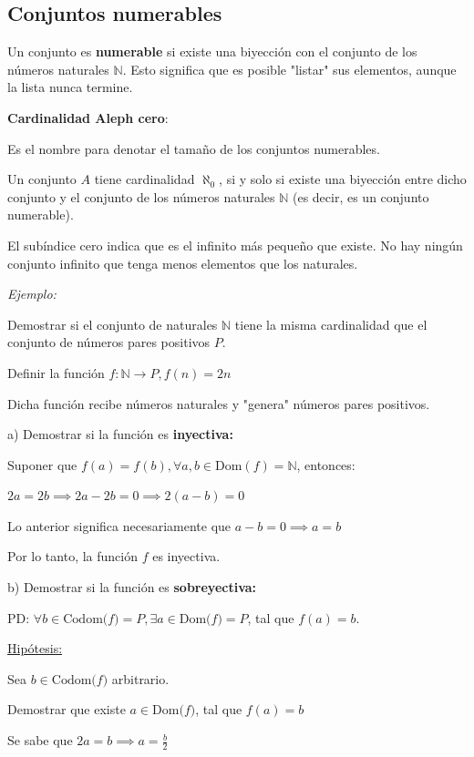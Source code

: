 \documentclass{article}
\begin{document}
\subsection{Conjuntos numerables}

Un conjunto es \textbf{numerable} si existe una biyección con el conjunto de los números naturales $\mathbb{N}$. Esto significa que es posible "listar" sus elementos, aunque la lista nunca termine.

\textbf{Cardinalidad Aleph cero}: 

Es el nombre para denotar el tamaño de los conjuntos numerables.

Un conjunto $A$ tiene cardinalidad $\aleph_0$, si y solo si existe una biyección entre dicho conjunto y el conjunto de los números naturales $\mathbb{N}$ (es decir, es un conjunto numerable).

El subíndice cero indica que es el infinito más pequeño que existe. No hay ningún conjunto infinito que tenga menos elementos que los naturales.

\textit{Ejemplo:}

Demostrar si el conjunto de naturales $\mathbb{N}$ tiene la misma cardinalidad que el conjunto de números pares positivos $P$.

Definir la función $f: \mathbb{N} \to P, f(n) = 2n$

Dicha función recibe números naturales y "genera" números pares positivos.

a) Demostrar si la función es \textbf{inyectiva:}

Suponer que $f(a) = f(b), \forall a, b \in \text{Dom}(f) = \mathbb{N}$, entonces:

$2a = 2b \implies 2a - 2b = 0 \implies 2(a - b) = 0$

Lo anterior significa necesariamente que $a - b = 0 \implies a = b$

Por lo tanto, la función $f$ es inyectiva.

b) Demostrar si la función es \textbf{sobreyectiva:}

PD: $\forall b \in \text{Codom($f$)} = P, \exists a \in \text{Dom($f$)} = P$, tal que $f(a) = b$.

\newpage
\underline{Hipótesis:}

Sea $b \in \text{Codom($f$)}$ arbitrario.

Demostrar que existe $a \in \text{Dom($f$)}$, tal que $f(a) = b$

Se sabe que $\displaystyle 2a = b \implies a = \frac{b}{2}$
\end{document}
